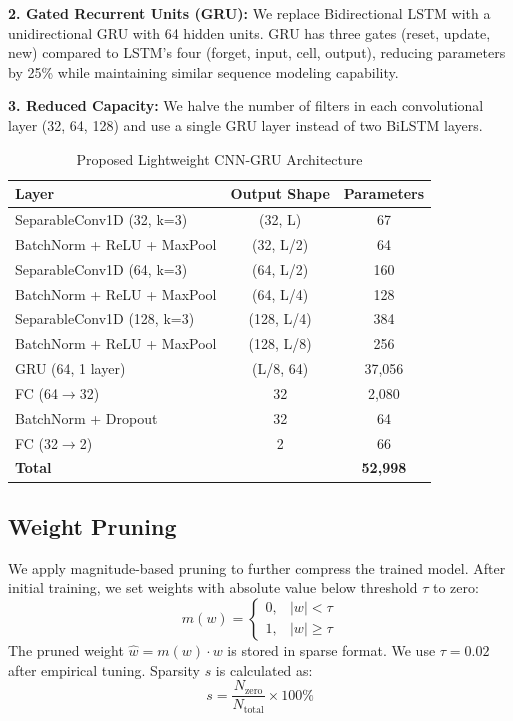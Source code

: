 \documentclass[10pt,journal]{IEEEtran}
\begin{document}
\noindent\textbf{2. Gated Recurrent Units (GRU):} We replace Bidirectional LSTM with a unidirectional GRU with 64 hidden units. GRU has three gates (reset, update, new) compared to LSTM's four (forget, input, cell, output), reducing parameters by 25\% while maintaining similar sequence modeling capability.

\noindent\textbf{3. Reduced Capacity:} We halve the number of filters in each convolutional layer (32, 64, 128) and use a single GRU layer instead of two BiLSTM layers.

\begin{table}[t]
\centering
\caption{Proposed Lightweight CNN-GRU Architecture}
\label{tab:lightweight}
\begin{tabular}{lcc}
\toprule
Layer & Output Shape & Parameters \\
\midrule
SeparableConv1D (32, k=3) & (32, L) & 67 \\
BatchNorm + ReLU + MaxPool & (32, L/2) & 64 \\
SeparableConv1D (64, k=3) & (64, L/2) & 160 \\
BatchNorm + ReLU + MaxPool & (64, L/4) & 128 \\
SeparableConv1D (128, k=3) & (128, L/4) & 384 \\
BatchNorm + ReLU + MaxPool & (128, L/8) & 256 \\
GRU (64, 1 layer) & (L/8, 64) & 37,056 \\
FC (64$\rightarrow$32) & 32 & 2,080 \\
BatchNorm + Dropout & 32 & 64 \\
FC (32$\rightarrow$2) & 2 & 66 \\
\midrule
\textbf{Total} & & \textbf{52,998} \\
\bottomrule
\end{tabular}
\end{table}

\subsection{Weight Pruning}
\label{sec:pruning}

We apply magnitude-based pruning to further compress the trained model. After initial training, we set weights with absolute value below threshold $\tau$ to zero:
\begin{equation}
m(w) = \begin{cases} 0, & |w| < \tau \\ 1, & |w| \geq \tau \end{cases}
\end{equation}
The pruned weight $\hat{w} = m(w) \cdot w$ is stored in sparse format. We use $\tau = 0.02$ after empirical tuning. Sparsity $s$ is calculated as:
\begin{equation}
s = \frac{N_{\text{zero}}}{N_{\text{total}}} \times 100\%
\label{eq:sparsity}
\end{equation}
\end{document}

